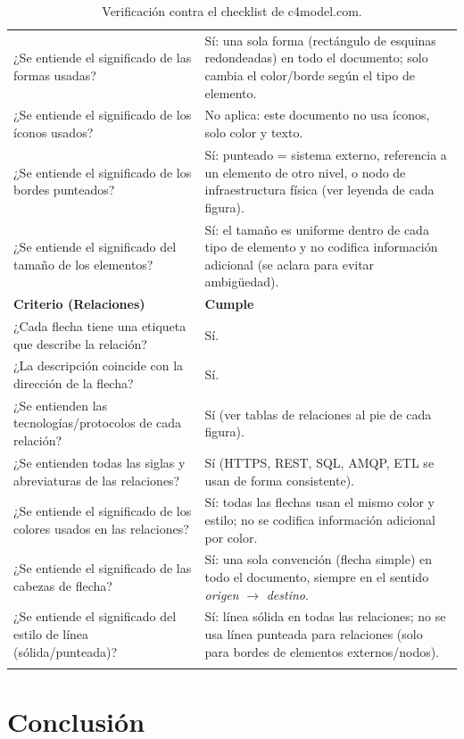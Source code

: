 \documentclass[12pt,a4paper]{article}
\begin{document}
\begin{longtable}{p{9.5cm}p{4.5cm}}
¿Se entiende el significado de las formas usadas? & Sí: una sola forma (rectángulo de esquinas redondeadas) en todo el documento; solo cambia el color/borde según el tipo de elemento.\\
¿Se entiende el significado de los íconos usados? & No aplica: este documento no usa íconos, solo color y texto.\\
¿Se entiende el significado de los bordes punteados? & Sí: punteado = sistema externo, referencia a un elemento de otro nivel, o nodo de infraestructura física (ver leyenda de cada figura).\\
¿Se entiende el significado del tamaño de los elementos? & Sí: el tamaño es uniforme dentro de cada tipo de elemento y no codifica información adicional (se aclara para evitar ambigüedad).\\
\midrule
\textbf{Criterio (Relaciones)} & \textbf{Cumple}\\
\midrule
¿Cada flecha tiene una etiqueta que describe la relación? & Sí.\\
¿La descripción coincide con la dirección de la flecha? & Sí.\\
¿Se entienden las tecnologías/protocolos de cada relación? & Sí (ver tablas de relaciones al pie de cada figura).\\
¿Se entienden todas las siglas y abreviaturas de las relaciones? & Sí (HTTPS, REST, SQL, AMQP, ETL se usan de forma consistente).\\
¿Se entiende el significado de los colores usados en las relaciones? & Sí: todas las flechas usan el mismo color y estilo; no se codifica información adicional por color.\\
¿Se entiende el significado de las cabezas de flecha? & Sí: una sola convención (flecha simple) en todo el documento, siempre en el sentido \textit{origen} $\rightarrow$ \textit{destino}.\\
¿Se entiende el significado del estilo de línea (sólida/punteada)? & Sí: línea sólida en todas las relaciones; no se usa línea punteada para relaciones (solo para bordes de elementos externos/nodos).\\
\bottomrule
\caption{Verificación contra el checklist de c4model.com.}
\end{longtable}

\section{Conclusión}
\end{document}
